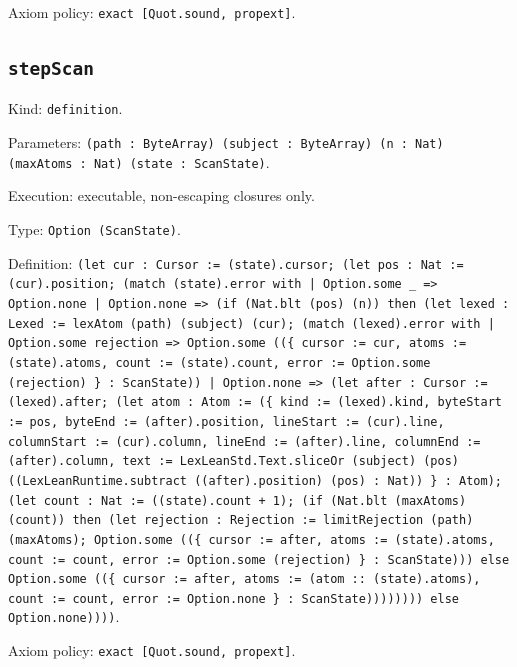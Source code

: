 \documentclass[11pt]{article}
\begin{document}
\noindent Axiom policy: \texttt{exact [Quot.sound, propext]}.\par
\subsection*{\texttt{stepScan}}
\noindent Kind: \texttt{definition}.\par
\noindent Parameters: \texttt{(path : ByteArray) (subject : ByteArray) (n : Nat) (maxAtoms : Nat) (state : ScanState)}.\par
\noindent Execution: executable, non-escaping closures only.\par
\noindent Type: \texttt{Option (ScanState)}.\par
\noindent Definition: \texttt{(let cur : Cursor := (state).cursor; (let pos : Nat := (cur).position; (match (state).error with | Option.some \_ => Option.none | Option.none => (if (Nat.blt (pos) (n)) then (let lexed : Lexed := lexAtom (path) (subject) (cur); (match (lexed).error with | Option.some rejection => Option.some ((\{ cursor := cur, atoms := (state).atoms, count := (state).count, error := Option.some (rejection) \} : ScanState)) | Option.none => (let after : Cursor := (lexed).after; (let atom : Atom := (\{ kind := (lexed).kind, byteStart := pos, byteEnd := (after).position, lineStart := (cur).line, columnStart := (cur).column, lineEnd := (after).line, columnEnd := (after).column, text := LexLeanStd.Text.sliceOr (subject) (pos) ((LexLeanRuntime.subtract ((after).position) (pos) : Nat)) \} : Atom); (let count : Nat := ((state).count + 1); (if (Nat.blt (maxAtoms) (count)) then (let rejection : Rejection := limitRejection (path) (maxAtoms); Option.some ((\{ cursor := after, atoms := (state).atoms, count := count, error := Option.some (rejection) \} : ScanState))) else Option.some ((\{ cursor := after, atoms := (atom :: (state).atoms), count := count, error := Option.none \} : ScanState)))))))) else Option.none))))}.\par
\noindent Axiom policy: \texttt{exact [Quot.sound, propext]}.\par
\end{document}
